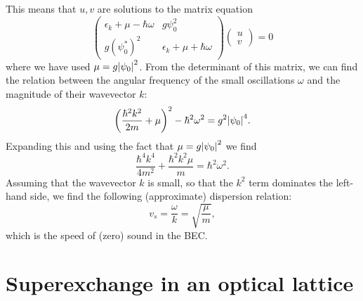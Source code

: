 \documentclass{book}
\theoremstyle{definition}
\newcommand{\f}[2]{\frac{#1}{#2}}
\newcommand{\lp}{\left(}
\newcommand{\rp}{\right)}
\begin{document}
This means that $u,v$ are solutions to the matrix equation
\begin{equation*}
\begin{pmatrix}
\epsilon_k  +  \mu-\hbar \omega & g\psi_0^2
\\ g (\psi_0^*)^2 & \epsilon_k + \mu + \hbar \omega
\end{pmatrix}
\begin{pmatrix}
u\\v
\end{pmatrix}
= 
0
\end{equation*}
where we have used $\mu = g\abs{\psi_0}^2$. From the determinant of this matrix, we can find the relation between the angular frequency of the small oscillations $\omega$ and the magnitude of their wavevector $k$:
\begin{equation*}
\lp \f{\hbar^2 k^2}{2m} + \mu\rp^2 - \hbar^2 \omega^2 = g^2 \abs{\psi_0}^4.
\end{equation*}
Expanding this and using the fact that $\mu = g \abs{\psi_0}^2$ we find 
\begin{equation*}
\f{\hbar^4 k^4}{4m^2} + \f{\hbar^2 k^2 \mu}{m} = \hbar^2 \omega^2.
\end{equation*}
Assuming that the wavevector $k$ is small, so that the $k^2$ term dominates the left-hand side, we find the following (approximate) dispersion relation: 
\begin{equation*}
v_s = \f{\omega}{k} = \sqrt{\f{\mu}{m}},
\end{equation*}
which is the speed of (zero) sound in the BEC.


















\section*{Superexchange in an optical lattice}
\end{document}
